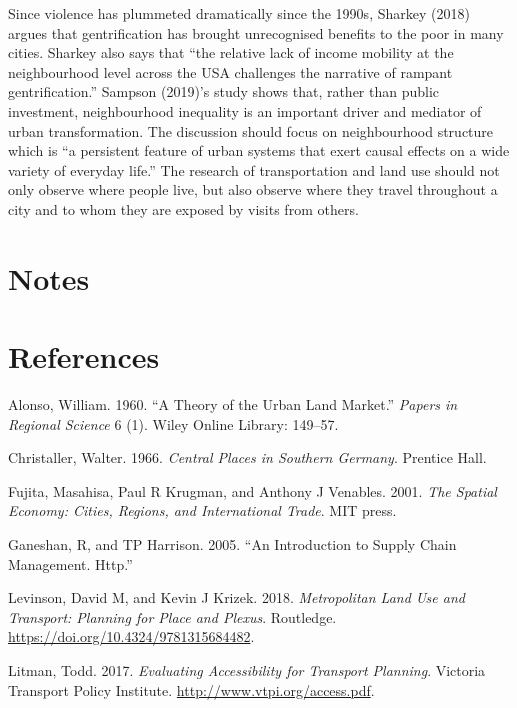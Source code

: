 \documentclass[12pt,]{article}
\begin{document}
Since violence has plummeted dramatically since the 1990s, Sharkey
(2018) argues that gentrification has brought unrecognised benefits to
the poor in many cities. Sharkey also says that ``the relative lack of
income mobility at the neighbourhood level across the USA challenges the
narrative of rampant gentrification.'' Sampson (2019)'s study shows
that, rather than public investment, neighbourhood inequality is an
important driver and mediator of urban transformation. The discussion
should focus on neighbourhood structure which is ``a persistent feature
of urban systems that exert causal effects on a wide variety of everyday
life.'' The research of transportation and land use should not only
observe where people live, but also observe where they travel throughout
a city and to whom they are exposed by visits from others.

\hypertarget{notes}{%
\section{Notes}\label{notes}}

\hypertarget{references}{%
\section*{References}\label{references}}

\hypertarget{refs}{}
\leavevmode\hypertarget{ref-alonso1960theory}{}%
Alonso, William. 1960. ``A Theory of the Urban Land Market.''
\emph{Papers in Regional Science} 6 (1). Wiley Online Library: 149--57.

\leavevmode\hypertarget{ref-christaller1966central}{}%
Christaller, Walter. 1966. \emph{Central Places in Southern Germany}.
Prentice Hall.

\leavevmode\hypertarget{ref-fujita2001spatial}{}%
Fujita, Masahisa, Paul R Krugman, and Anthony J Venables. 2001.
\emph{The Spatial Economy: Cities, Regions, and International Trade}.
MIT press.

\leavevmode\hypertarget{ref-ganeshan2005introduction}{}%
Ganeshan, R, and TP Harrison. 2005. ``An Introduction to Supply Chain
Management. Http.''

\leavevmode\hypertarget{ref-levinson2018metropolitan}{}%
Levinson, David M, and Kevin J Krizek. 2018. \emph{Metropolitan Land Use
and Transport: Planning for Place and Plexus}. Routledge.
\url{https://doi.org/10.4324/9781315684482}.

\leavevmode\hypertarget{ref-litman2017evaluating}{}%
Litman, Todd. 2017. \emph{Evaluating Accessibility for Transport
Planning}. Victoria Transport Policy Institute.
\url{http://www.vtpi.org/access.pdf}.
\end{document}

